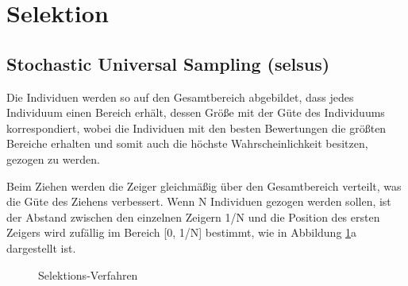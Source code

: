 \section{Selektion}\label{selection}


\subsection{Stochastic Universal Sampling (selsus)}
Die Individuen werden so auf
den Gesamtbereich abgebildet, dass jedes Individuum einen Bereich erhält, dessen
Größe mit der Güte des Individuums korrespondiert, wobei die Individuen mit den
besten Bewertungen die größten Bereiche erhalten und somit auch die höchste
Wahrscheinlichkeit besitzen, gezogen zu werden.

Beim Ziehen werden die Zeiger gleichmäßig über den Gesamtbereich verteilt, was
die Güte des Ziehens verbessert. Wenn N Individuen gezogen werden sollen, ist
der Abstand zwischen den einzelnen Zeigern 1/N und die Position des ersten
Zeigers wird zufällig im Bereich [0, 1/N] bestimmt, wie in Abbildung
\ref{fig.selection}a dargestellt ist.

\begin{figure}[!h] \centering
    \hfill
    \caption{Selektions-Verfahren \citep{mcl}}
    \label{fig.selection}
\end{figure}


